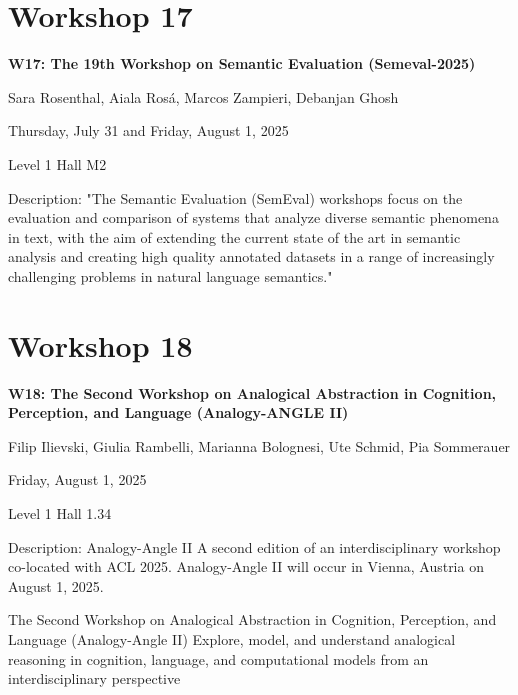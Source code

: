\clearpage



\section[W17: The 19th Workshop on Semantic Evaluation (Semeval-2025)]{Workshop 17}

\begin{center}
    {\Large \textbf{W17: The 19th Workshop on Semantic Evaluation (Semeval-2025)}}

   Sara Rosenthal, Aiala Rosá, Marcos Zampieri, Debanjan Ghosh
    
    Thursday, July 31 and Friday, August 1, 2025
    
    Level 1 Hall M2

\end{center}

Description: "The Semantic Evaluation (SemEval) workshops focus on the evaluation and comparison of systems that
analyze diverse semantic phenomena in text, with the aim of extending the current state of the art in
semantic analysis and creating high quality annotated datasets in a range of increasingly challenging
problems in natural language semantics."

\clearpage



\section[W18: The Second Workshop on Analogical Abstraction in Cognition, Perception, and Language (Analogy-ANGLE II)]{Workshop 18}

\begin{center}
    {\Large \textbf{W18: The Second Workshop on Analogical Abstraction in Cognition, Perception, and Language (Analogy-ANGLE II)}}

  Filip Ilievski, Giulia Rambelli, Marianna Bolognesi, Ute Schmid, Pia Sommerauer

    Friday, August 1, 2025
    
   Level 1 Hall 1.34
\end{center}

Description: Analogy-Angle II
A second edition of an interdisciplinary workshop co-located with ACL 2025. Analogy-Angle II will occur in Vienna, Austria on August 1, 2025.

The Second Workshop on Analogical Abstraction in Cognition, Perception, and Language (Analogy-Angle II)
Explore, model, and understand analogical reasoning in cognition, language, and computational models from an interdisciplinary perspective

